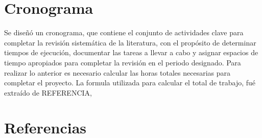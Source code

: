 \documentclass{article}
\begin{document}
\newpage

\section{Cronograma}
Se diseñó un cronograma, que contiene el conjunto de actividades clave para completar la revisión sistemática de la literatura, 
con el propósito de determinar tiempos de ejecución, documentar las tareas a llevar a cabo y asignar espacios de tiempo apropiados 
para completar la revisión en el periodo designado. Para realizar lo anterior es necesario calcular las horas totales necesarias para completar el proyecto. 
La formula utilizada para calcular el total de trabajo, fué extraído de REFERENCIA,

\newpage

\section{Referencias}
\printbibliography
\end{document}
